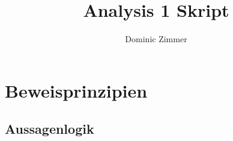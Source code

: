 \documentclass{scrreprt}
\begin{document}
	\title{Analysis 1 Skript}
 	\author{Dominic Zimmer}
  	\maketitle 

	\tableofcontents


	\chapter{Beweisprinzipien}


	\section{Aussagenlogik}	
\end{document}
